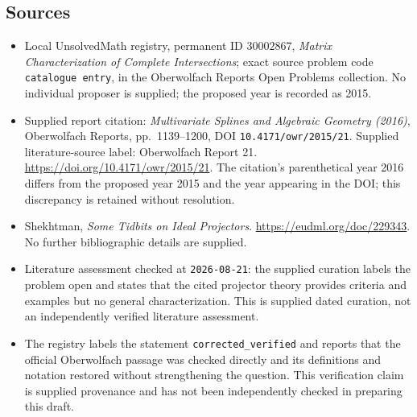 \documentclass[11pt]{article}
\begin{document}
\subsection{Sources}
\begin{itemize}
\item Local UnsolvedMath registry, permanent ID \(30002867\), \emph{Matrix Characterization of Complete Intersections}; exact source problem code \texttt{catalogue entry}, in the Oberwolfach Reports Open Problems collection. No individual proposer is supplied; the proposed year is recorded as 2015.
\item Supplied report citation: \emph{Multivariate Splines and Algebraic Geometry (2016)}, Oberwolfach Reports, pp.\ 1139--1200, DOI \texttt{10.4171/owr/2015/21}. Supplied literature-source label: Oberwolfach Report 21. \url{https://doi.org/10.4171/owr/2015/21}. The citation's parenthetical year 2016 differs from the proposed year 2015 and the year appearing in the DOI; this discrepancy is retained without resolution.
\item Shekhtman, \emph{Some Tidbits on Ideal Projectors}. \url{https://eudml.org/doc/229343}. No further bibliographic details are supplied.
\item Literature assessment checked at \texttt{2026-08-21}: the supplied curation labels the problem open and states that the cited projector theory provides criteria and examples but no general characterization. This is supplied dated curation, not an independently verified literature assessment.
\item The registry labels the statement \texttt{corrected\_verified} and reports that the official Oberwolfach passage was checked directly and its definitions and notation restored without strengthening the question. This verification claim is supplied provenance and has not been independently checked in preparing this draft.
\end{itemize}
\end{document}
